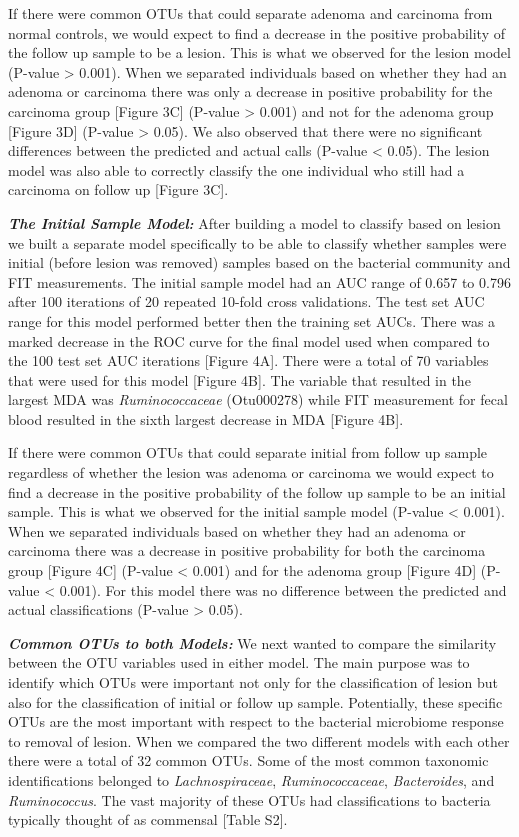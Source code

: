 \documentclass[12pt,]{article}
\begin{document}
If there were common OTUs that could separate adenoma and carcinoma from
normal controls, we would expect to find a decrease in the positive
probability of the follow up sample to be a lesion. This is what we
observed for the lesion model (P-value \textgreater{} 0.001). When we
separated individuals based on whether they had an adenoma or carcinoma
there was only a decrease in positive probability for the carcinoma
group {[}Figure 3C{]} (P-value \textgreater{} 0.001) and not for the
adenoma group {[}Figure 3D{]} (P-value \textgreater{} 0.05). We also
observed that there were no significant differences between the
predicted and actual calls (P-value \textless{} 0.05). The lesion model
was also able to correctly classify the one individual who still had a
carcinoma on follow up {[}Figure 3C{]}.

\textbf{\emph{The Initial Sample Model:}} After building a model to
classify based on lesion we built a separate model specifically to be
able to classify whether samples were initial (before lesion was
removed) samples based on the bacterial community and FIT measurements.
The initial sample model had an AUC range of 0.657 to 0.796 after 100
iterations of 20 repeated 10-fold cross validations. The test set AUC
range for this model performed better then the training set AUCs. There
was a marked decrease in the ROC curve for the final model used when
compared to the 100 test set AUC iterations {[}Figure 4A{]}. There were
a total of 70 variables that were used for this model {[}Figure 4B{]}.
The variable that resulted in the largest MDA was \emph{Ruminococcaceae}
(Otu000278) while FIT measurement for fecal blood resulted in the sixth
largest decrease in MDA {[}Figure 4B{]}.

If there were common OTUs that could separate initial from follow up
sample regardless of whether the lesion was adenoma or carcinoma we
would expect to find a decrease in the positive probability of the
follow up sample to be an initial sample. This is what we observed for
the initial sample model (P-value \textless{} 0.001). When we separated
individuals based on whether they had an adenoma or carcinoma there was
a decrease in positive probability for both the carcinoma group
{[}Figure 4C{]} (P-value \textless{} 0.001) and for the adenoma group
{[}Figure 4D{]} (P-value \textless{} 0.001). For this model there was no
difference between the predicted and actual classifications (P-value
\textgreater{} 0.05).

\textbf{\emph{Common OTUs to both Models:}} We next wanted to compare
the similarity between the OTU variables used in either model. The main
purpose was to identify which OTUs were important not only for the
classification of lesion but also for the classification of initial or
follow up sample. Potentially, these specific OTUs are the most
important with respect to the bacterial microbiome response to removal
of lesion. When we compared the two different models with each other
there were a total of 32 common OTUs. Some of the most common taxonomic
identifications belonged to \emph{Lachnospiraceae},
\emph{Ruminococcaceae}, \emph{Bacteroides}, and \emph{Ruminococcus}. The
vast majority of these OTUs had classifications to bacteria typically
thought of as commensal {[}Table S2{]}.
\end{document}

